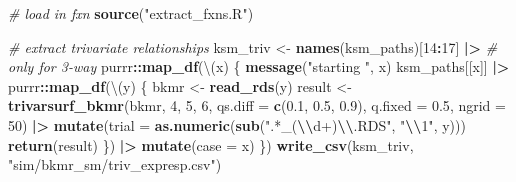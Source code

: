 \documentclass[12pt, twoside]{amherstthesis}
\newenvironment{Shaded}{\begin{snugshade}}{\end{snugshade}}
\newcommand{\AttributeTok}[1]{\textcolor[rgb]{0.13,0.29,0.53}{#1}}
\newcommand{\CommentTok}[1]{\textcolor[rgb]{0.56,0.35,0.01}{\textit{#1}}}
\newcommand{\DecValTok}[1]{\textcolor[rgb]{0.00,0.00,0.81}{#1}}
\newcommand{\FloatTok}[1]{\textcolor[rgb]{0.00,0.00,0.81}{#1}}
\newcommand{\FunctionTok}[1]{\textcolor[rgb]{0.13,0.29,0.53}{\textbf{#1}}}
\newcommand{\NormalTok}[1]{#1}
\newcommand{\OtherTok}[1]{\textcolor[rgb]{0.56,0.35,0.01}{#1}}
\newcommand{\SpecialCharTok}[1]{\textcolor[rgb]{0.81,0.36,0.00}{\textbf{#1}}}
\newcommand{\StringTok}[1]{\textcolor[rgb]{0.31,0.60,0.02}{#1}}
\begin{document}
\begin{Shaded}
\begin{Highlighting}[]
\CommentTok{\# load in fxn}
\FunctionTok{source}\NormalTok{(}\StringTok{"extract\_fxns.R"}\NormalTok{)}

\CommentTok{\# extract trivariate relationships}
\NormalTok{ksm\_triv }\OtherTok{\textless{}{-}} \FunctionTok{names}\NormalTok{(ksm\_paths)[}\DecValTok{14}\SpecialCharTok{:}\DecValTok{17}\NormalTok{] }\SpecialCharTok{|\textgreater{}} \CommentTok{\# only for 3{-}way}
\NormalTok{  purrr}\SpecialCharTok{::}\FunctionTok{map\_df}\NormalTok{(\textbackslash{}(x) \{}
    \FunctionTok{message}\NormalTok{(}\StringTok{"starting "}\NormalTok{, x)}
\NormalTok{    ksm\_paths[[x]] }\SpecialCharTok{|\textgreater{}} 
\NormalTok{      purrr}\SpecialCharTok{::}\FunctionTok{map\_df}\NormalTok{(\textbackslash{}(y) \{}
\NormalTok{        bkmr }\OtherTok{\textless{}{-}} \FunctionTok{read\_rds}\NormalTok{(y)}
\NormalTok{        result }\OtherTok{\textless{}{-}} \FunctionTok{trivarsurf\_bkmr}\NormalTok{(bkmr, }\DecValTok{4}\NormalTok{, }\DecValTok{5}\NormalTok{, }\DecValTok{6}\NormalTok{, }
                                  \AttributeTok{qs.diff =} \FunctionTok{c}\NormalTok{(}\FloatTok{0.1}\NormalTok{, }\FloatTok{0.5}\NormalTok{, }\FloatTok{0.9}\NormalTok{), }
                                  \AttributeTok{q.fixed =} \FloatTok{0.5}\NormalTok{, }\AttributeTok{ngrid =} \DecValTok{50}\NormalTok{) }\SpecialCharTok{|\textgreater{}} 
          \FunctionTok{mutate}\NormalTok{(}\AttributeTok{trial =} \FunctionTok{as.numeric}\NormalTok{(}\FunctionTok{sub}\NormalTok{(}\StringTok{".*\_(}\SpecialCharTok{\textbackslash{}\textbackslash{}}\StringTok{d+)}\SpecialCharTok{\textbackslash{}\textbackslash{}}\StringTok{.RDS"}\NormalTok{, }\StringTok{"}\SpecialCharTok{\textbackslash{}\textbackslash{}}\StringTok{1"}\NormalTok{, y)))}
        \FunctionTok{return}\NormalTok{(result)}
\NormalTok{      \}) }\SpecialCharTok{|\textgreater{}} 
      \FunctionTok{mutate}\NormalTok{(}\AttributeTok{case =}\NormalTok{ x)}
\NormalTok{  \})}
\FunctionTok{write\_csv}\NormalTok{(ksm\_triv, }\StringTok{"sim/bkmr\_sm/triv\_expresp.csv"}\NormalTok{)}


\end{Highlighting}
\end{Shaded}
\end{document}
